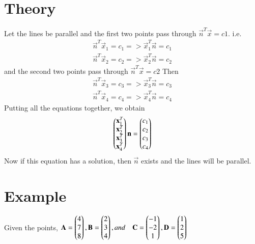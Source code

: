 \documentclass[journal,12pt,twocolumn]{IEEEtran}
\begin{document}
\section{Theory}
Let the lines be parallel and the first two points pass through $\vec{n}^T\vec{x} = c1$. i.e.
\begin{align}
	\vec{n}^T\vec{x}_1=c_1 => \vec{x}_1^T\vec{n} = c_1 \\
	\vec{n}^T\vec{x}_2=c_2 => \vec{x}_2^T\vec{n} = c_2
\end{align}
and the second two points pass through $\vec{n}^T\vec{x} = c2$
Then
\begin{align}
	\vec{n}^T\vec{x}_3=c_3 => \vec{x}_3^T\vec{n} = c_3 \\
	\vec{n}^T\vec{x}_4=c_4 => \vec{x}_4^T\vec{n} = c_4
\end{align}
Putting all the equations together, we obtain
\begin{align}
	\begin{pmatrix}\mathbf{x}_1^T\\ \mathbf{x}_2^T\\ \mathbf{x}_3^T\\ \mathbf{x}_4^T\end{pmatrix}\mathbf{n} = \begin{pmatrix}c_1\\c_2\\c_3\\c_4\end{pmatrix}
\end{align}
Now if this equation has a solution, then $\vec{n}$ exists and the lines will be parallel.
\section{Example}
Given the points, $\mathbf{A} = \begin{pmatrix} 4\\7\\	8\end{pmatrix}, 
\mathbf{B} = \begin{pmatrix} 2\\ 3\\ 4\end{pmatrix}, and \quad
\mathbf{C} = \begin{pmatrix} -1\\ -2\\ 1 \end{pmatrix}, 
\mathbf{D} = \begin{pmatrix} 1\\ 2\\ 5\end{pmatrix} $
\end{document}
